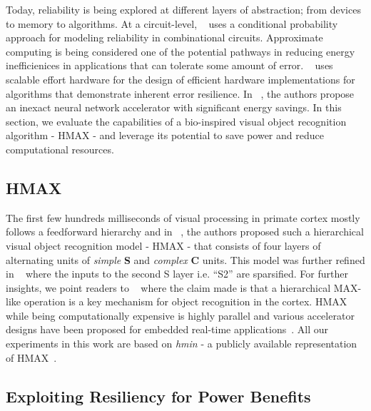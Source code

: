 Today, reliability is being explored at different layers of abstraction; from devices to memory to algorithms.
At a circuit-level, ~\cite{chen2015fast} uses a conditional probability approach for modeling reliability in combinational circuits.
Approximate computing is being considered one of the potential pathways in reducing energy inefficienices in applications that can tolerate some amount of error.
~\cite{chippa} uses scalable effort hardware for the design of efficient hardware implementations for algorithms that demonstrate inherent error resilience.
In ~\cite{temam2015}, the authors propose an inexact neural network accelerator with significant energy savings.
In this section, we evaluate the capabilities of a bio-inspired visual object recognition algorithm - HMAX - and leverage its potential to save 
power and reduce computational resources. 

\subsection{HMAX}
The first few hundreds milliseconds of visual processing in primate
cortex mostly follows a feedforward hierarchy and in ~\cite{serre}, the authors proposed such a hierarchical visual object recognition model - HMAX - that consists of 
four layers of alternating units of \textit{simple} \textbf{S} and \textit{complex} \textbf{C} units. 
This model was further refined in ~\cite{Mutch2008} where the inputs to 
the second S layer i.e. ``S2'' are sparsified. For further insights, we point readers to ~\cite{poggio} where the claim made is 
that a hierarchical MAX-like operation is a key mechanism for object recognition in the cortex.
HMAX while being computationally expensive is highly parallel and various accelerator designs have been proposed for 
embedded real-time applications~\cite{Kestur2012, Maashri2012a}. 
All our experiments in this work are based on \textit{hmin} - a publicly available representation of HMAX~\cite{hmin}.

\subsection{Exploiting Resiliency for Power Benefits}

